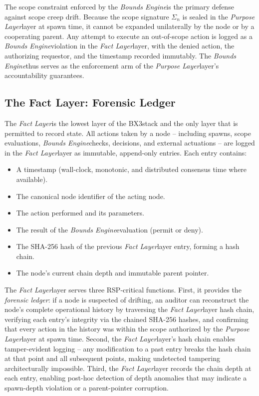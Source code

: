 \documentclass[12pt]{article}
\def\bxthree{BX3}
\def\purpose{\textit{Purpose Layer}}
\def\bounds{\textit{Bounds Engine}}
\def\fact{\textit{Fact Layer}}
\begin{document}
The scope constraint enforced by the \bounds is the primary defense against scope creep drift. Because the scope signature $\Sigma_n$ is sealed in the \purpose layer at spawn time, it cannot be expanded unilaterally by the node or by a cooperating parent. Any attempt to execute an out-of-scope action is logged as a \bounds violation in the \fact layer, with the denied action, the authorizing requestor, and the timestamp recorded immutably. The \bounds thus serves as the enforcement arm of the \purpose layer's accountability guarantees.

\subsection{The Fact Layer: Forensic Ledger}

The \fact is the lowest layer of the \bxthree stack and the only layer that is permitted to record state. All actions taken by a node -- including spawns, scope evaluations, \bounds checks, decisions, and external actuations -- are logged in the \fact layer as immutable, append-only entries. Each entry contains:

\begin{itemize}
    \item A timestamp (wall-clock, monotonic, and distributed consensus time where available).
    \item The canonical node identifier of the acting node.
    \item The action performed and its parameters.
    \item The result of the \bounds evaluation (permit or deny).
    \item The SHA-256 hash of the previous \fact layer entry, forming a hash chain.
    \item The node's current chain depth and immutable parent pointer.
\end{itemize}

The \fact layer serves three RSP-critical functions. First, it provides the \emph{forensic ledger}: if a node is suspected of drifting, an auditor can reconstruct the node's complete operational history by traversing the \fact layer hash chain, verifying each entry's integrity via the chained SHA-256 hashes, and confirming that every action in the history was within the scope authorized by the \purpose layer at spawn time. Second, the \fact layer's hash chain enables tamper-evident logging -- any modification to a past entry breaks the hash chain at that point and all subsequent points, making undetected tampering architecturally impossible. Third, the \fact layer records the chain depth at each entry, enabling post-hoc detection of depth anomalies that may indicate a spawn-depth violation or a parent-pointer corruption.
\end{document}
